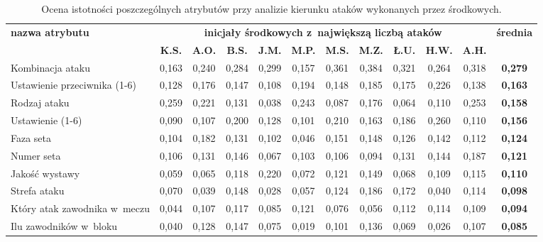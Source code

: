 \documentclass[a4paper,twoside,12pt]{book}
\begin{document}
\begin{table}
\centering
\caption{Ocena istotności poszczególnych atrybutów przy analizie kierunku ataków wykonanych przez środkowych.}
\label{tab:atrybutyAtakŚrodkowi}
\begin{adjustbox}{angle=90}
\begin{tabular}{|l|c|c|c|c|c|c|c|c|c|c|c|}
\hline
\multirow{2}{*}{\textbf{nazwa atrybutu}} &
\multicolumn{10}{c|}{\textbf{inicjały środkowych z~największą liczbą ataków}} & 
\multirow{2}{*}{\textbf{średnia}}\\
\cline{2-11} & \textbf{K.S.} & \textbf{A.O.} & \textbf{B.S.} & \textbf{J.M.} & \textbf{M.P.} & \textbf{M.S.} & \textbf{M.Z.} & \textbf{Ł.U.} & \textbf{H.W.} & \textbf{A.H.} & \\
\hline
Kombinacja ataku & 0,163 & \cellcolor{green}0,240 & \cellcolor{green}0,284 & \cellcolor{green}0,299 & 0,157 & \cellcolor{green}0,361 & \cellcolor{green}0,384 & \cellcolor{green}0,321 & \cellcolor{green}0,264 & \cellcolor{green}0,318 & \textbf{0,279} \\ \hline
 Ustawienie przeciwnika (1-6) & 0,128 & 0,176 & 0,147 & 0,108 & 0,194 & 0,148 & 0,185 & 0,175 & 0,226 & 0,138 & \textbf{0,163} \\ \hline
Rodzaj ataku & \cellcolor{green}0,259 & 0,221 & 0,131 & 0,038 & \cellcolor{green}0,243 & 0,087 & 0,176 & 0,064 & 0,110 & 0,253 & \textbf{0,158} \\ \hline
Ustawienie (1-6) & 0,090 & 0,107 & 0,200 & 0,128 & 0,101 & 0,210 & 0,163 & 0,186 & 0,260 & 0,110 & \textbf{0,156} \\ \hline
Faza seta & 0,104 & 0,182 & 0,131 & 0,102 & 0,046 & 0,151 & 0,148 & 0,126 & 0,142 & 0,112 & \textbf{0,124} \\ \hline
Numer seta & 0,106 & 0,131 & 0,146 & 0,067 & 0,103 & 0,106 & 0,094 & 0,131 & 0,144 & 0,187 & \textbf{0,121} \\ \hline
Jakość wystawy & 0,059 & 0,065 & 0,118 & 0,220 & 0,072 & 0,121 & 0,149 & 0,068 & 0,109 & 0,115 & \textbf{0,110} \\ \hline
Strefa ataku & 0,070 & 0,039 & 0,148 & 0,028 & 0,057 & 0,124 & 0,186 & 0,172 & 0,040 & 0,114 & \textbf{0,098} \\ \hline
Który atak zawodnika w~meczu & 0,044 & 0,107 & 0,117 & 0,085 & 0,121 & 0,076 & 0,056 & 0,112 & 0,114 & 0,109 & \textbf{0,094} \\ \hline
Ilu zawodników w~bloku & 0,040 & 0,128 & 0,147 & 0,075 & 0,019 & 0,101 & 0,136 & 0,069 & 0,026 & 0,107 & \textbf{0,085} \\ \hline

\end{tabular}
\end{adjustbox}
\end{table}
\end{document}
